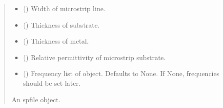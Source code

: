 \documentclass[letterpaper,10pt,english]{sphinxmanual}
\begin{document}
\begin{fulllineitems}
\begin{fulllineitems}
\begin{quote}
\begin{description}
\begin{itemize}
\item {}
\sphinxAtStartPar
{} () \textendash{} Width of microstrip line.

\item {}
\sphinxAtStartPar
{} () \textendash{} Thickness of substrate.

\item {}
\sphinxAtStartPar
{} () \textendash{} Thickness of metal.

\item {}
\sphinxAtStartPar
{} () \textendash{} Relative permittivity of microstrip substrate.

\item {}
\sphinxAtStartPar
{} (\sphinxstyleliteralemphasis{\sphinxupquote{, }}) \textendash{} Frequency list of object. Defaults to None. If None, frequencies should be set later.

\end{itemize}

\sphinxAtStartPar
An spfile object.

\sphinxAtStartPar
{\hyperref[\detokenize{touchstone:touchstone.spfile}]{}}

\end{description}\end{quote}

\end{fulllineitems}



\end{fulllineitems}
\end{document}
